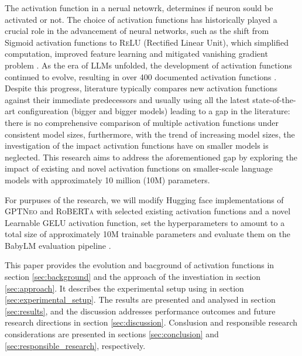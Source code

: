 The activation function in a nerual netowrk, determines if neuron sould be activated or not. The choice of activation functions has historically played a crucial role in the advancement of neural networks, such as the shift from Sigmoid activation functions to \textsc{ReLU} (Rectified Linear Unit), which simplified computation, improved feature learning and mitigated vanishing gradient problem \cite{nair2010rectified}. As the era of LLMs unfolded, the development of activation functions continued to evolve, resulting in over 400 documented activation functions \cite{Kunc2024}. Despite this progress, literature typically compares new activation functions against their immediate predecessors and usually using all the latest state-of-the-art configureation (bigger and bigger models) leading to a gap in the literature: there is no comprehensive comparison of multiple activation functions under consistent model sizes, furthermore, with the trend of increasing model sizes, the investigation of the impact activation functions have on smaller models is neglected. This research aims to address the aforementioned gap by exploring the impact of existing and novel activation functions on smaller-scale language models with approximately 10 million (10M) parameters. 

For purpuses of the research, we will modify Hugging face implementations of \textsc{GPTNeo} \cite{huggingfaceNEO} and \textsc{RoBERTa} \cite{huggingfaceRoberta} with selected existing activation functions and a novel Learnable GELU activation function, set the hyperparameters to amount to a total size of approximately 10M trainable parameters and evaluate them on the BabyLM evaluation pipeline \cite{Warstadt2023}.

This paper provides the evolution and bacground of activation functions in section \ref{sec:background} and the approach of the investiation in section \ref{sec:approach}. It describes the experimental setup using in section \ref{sec:experimental_setup}. The results are presented and analysed in section \ref{sec:results}, and the discussion addresses performance outcomes and future research directions in section \ref{sec:discussion}. Conslusion and responsible research considerations are presented in sections \ref{sec:conclusion} and \ref{sec:responsible_research}, respectively.
